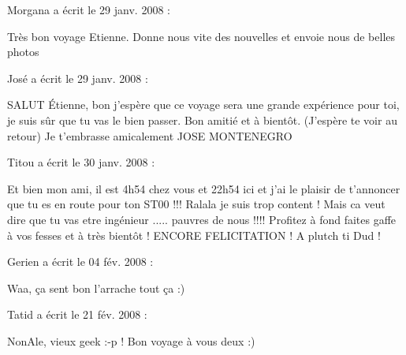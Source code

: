 \medskip
Morgana a écrit le 29 janv. 2008 :
\begin{displayquote}
Très bon voyage Etienne. Donne nous vite des nouvelles et envoie nous de belles photos
\end{displayquote}

\medskip
José a écrit le 29 janv. 2008 :
\begin{displayquote}
SALUT Étienne, bon j'espère que ce voyage sera une grande expérience pour toi, je suis sûr que tu vas le bien passer.
 Bon amitié et à bientôt. (J'espère te voir au retour)
 Je t'embrasse amicalement JOSE MONTENEGRO
\end{displayquote}

\medskip
Titou a écrit le 30 janv. 2008 :
\begin{displayquote}
Et bien mon ami, il est 4h54 chez vous et 22h54 ici et j'ai le plaisir de t'annoncer que tu es en route pour ton ST00 !!! Ralala je suis trop content ! Mais ca veut dire que tu vas etre ingénieur ..... pauvres de nous !!!! Profitez à fond faites gaffe à vos fesses et à très bientôt ! ENCORE FELICITATION ! A plutch ti Dud !
\end{displayquote}

\medskip
Gerien a écrit le 04 fév. 2008 :
\begin{displayquote}
Waa, ça sent bon l'arrache tout ça :)
\end{displayquote}

\medskip
Tatid a écrit le 21 fév. 2008 :
\begin{displayquote}
NonAle, vieux geek :-p !
Bon voyage à vous deux :)
\end{displayquote}
